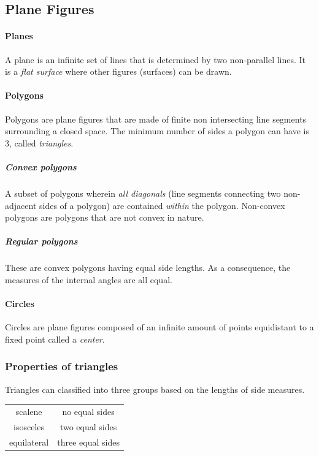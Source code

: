 \subsection{Plane Figures}
\paragraph{Planes}
A plane is an infinite set of lines that is determined by two non-parallel lines.
It is a \emph{flat surface} where other figures (surfaces) can be drawn.

\paragraph{Polygons}
Polygons are plane figures that are made of finite non intersecting line segments surrounding a closed space.
The minimum number of sides a polygon can have is $3$, called \emph{triangles}.

\subparagraph{Convex polygons}
A subset of polygons wherein \emph{all diagonals} (line segments connecting two non-adjacent sides of a polygon) are contained \emph{within} the polygon.
Non-convex polygons are polygons that are not convex in nature. 

\subparagraph{Regular polygons}
These are convex polygons having equal side lengths.
As a consequence, the measures of the internal angles are all equal.

\paragraph{Circles}
Circles are plane figures composed of an infinite amount of points equidistant to a fixed point called a \emph{center}.

\subsubsection{Properties of triangles}
Triangles can classified into three groups based on the lengths of side measures.

\begin{table}[h!]
    \centering
    \begin{tabular}{c|c}
        scalene & no equal sides \\
        isosceles & two equal sides \\
        equilateral & three equal sides
    \end{tabular}
\end{table}


